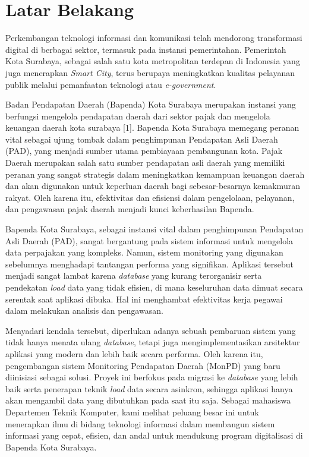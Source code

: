 \section{Latar Belakang}
\label{sec:latarbelakang}

Perkembangan teknologi informasi dan komunikasi telah mendorong transformasi digital di berbagai sektor, termasuk pada instansi pemerintahan. Pemerintah Kota Surabaya, sebagai salah satu kota metropolitan terdepan di Indonesia yang juga menerapkan \emph{Smart City}, terus berupaya meningkatkan kualitas pelayanan publik melalui pemanfaatan teknologi atau \emph{e-government}.

Badan Pendapatan Daerah (Bapenda) Kota Surabaya merupakan instansi yang berfungsi mengelola pendapatan daerah dari sektor pajak dan mengelola keuangan daerah kota surabaya [1]. Bapenda Kota Surabaya memegang peranan vital sebagai ujung tombak dalam penghimpunan Pendapatan Asli Daerah (PAD), yang menjadi sumber utama pembiayaan pembangunan kota. Pajak Daerah merupakan salah satu sumber pendapatan asli daerah yang memiliki peranan yang sangat strategis dalam meningkatkan kemampuan keuangan daerah dan akan digunakan untuk keperluan daerah bagi sebesar-besarnya kemakmuran rakyat. Oleh karena itu, efektivitas dan efisiensi dalam pengelolaan, pelayanan, dan pengawasan pajak daerah menjadi kunci keberhasilan Bapenda.

Bapenda Kota Surabaya, sebagai instansi vital dalam penghimpunan Pendapatan Asli Daerah (PAD), sangat bergantung pada sistem informasi untuk mengelola data perpajakan yang kompleks. Namun, sistem monitoring yang digunakan sebelumnya menghadapi tantangan performa yang signifikan. Aplikasi tersebut menjadi sangat lambat karena \emph{database} yang kurang terorganisir serta pendekatan \emph{load} data yang tidak efisien, di mana keseluruhan data dimuat secara serentak saat aplikasi dibuka. Hal ini menghambat efektivitas kerja pegawai dalam melakukan analisis dan pengawasan.

Menyadari kendala tersebut, diperlukan adanya sebuah pembaruan sistem yang tidak hanya menata ulang \emph{database}, tetapi juga mengimplementasikan arsitektur aplikasi yang modern dan lebih baik secara performa. Oleh karena itu, pengembangan sistem Monitoring Pendapatan Daerah (MonPD) yang baru diinisiasi sebagai solusi. Proyek ini berfokus pada migrasi ke \emph{database} yang lebih baik serta penerapan teknik \emph{load} data secara asinkron, sehingga aplikasi hanya akan mengambil data yang dibutuhkan pada saat itu saja. Sebagai mahasiswa Departemen Teknik Komputer, kami melihat peluang besar ini untuk menerapkan ilmu di bidang teknologi informasi dalam membangun sistem informasi yang cepat, efisien, dan andal untuk mendukung program digitalisasi di Bapenda Kota Surabaya.
